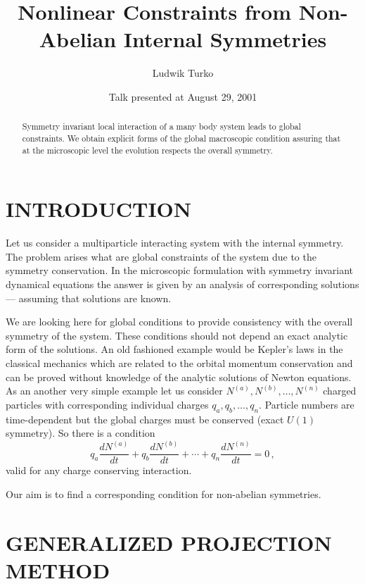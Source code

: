\documentclass[a4paper,aps]{revtex4}
\begin{document}
\title{Nonlinear Constraints from Non-Abelian Internal Symmetries}%
\author{Ludwik Turko}
%
\date{Talk presented at August 29, 2001}
\begin{abstract}
Symmetry invariant local interaction of a many body system leads
to global constraints. We obtain explicit forms of the global
macroscopic condition assuring that at the microscopic level  the
evolution respects the overall symmetry.
\end{abstract}
\maketitle
\section{INTRODUCTION}

Let us consider a multiparticle interacting system with the internal
symmetry. The problem arises what are global constraints of the system
due to the symmetry conservation. In the microscopic formulation with
symmetry invariant dynamical equations the answer is given by an
analysis of corresponding solutions --- assuming that solutions are
known.

We are looking here for global conditions to provide consistency with
the overall symmetry of the system. These conditions should not depend
an exact analytic form of the solutions. An old fashioned example would
be Kepler's laws in the classical mechanics which are related to the
orbital momentum conservation and can be proved without knowledge of the
analytic solutions of Newton equations. As an another very simple
example let  us consider $N^{(a)}, N^{(b)},\dots, N^{(n)}$ charged
particles with corresponding individual charges $q_a, q_b,\dots, q_n.$
Particle numbers are time-dependent but the global charges must be
conserved (exact $U(1)$ symmetry). So there is a condition
\begin{equation}\label{abcharge}
q_a\frac{d N^{(a)}}{dt} + q_b\frac{d
N^{(b)}}{dt}+ \cdots + q_n\frac{d N^{(n)}}{dt} = 0\,,
\end{equation}
valid for any charge conserving interaction.

Our aim\cite{TurRaf} is to find a corresponding condition for non-abelian
symmetries.

\section{GENERALIZED PROJECTION METHOD}
\end{document}
